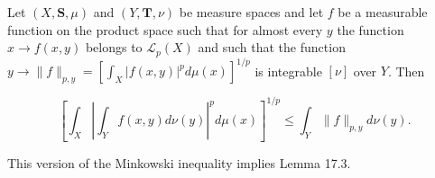Let $(X, \mathbf{S}, \mu)$ and $(Y, \mathbf{T}, \nu)$ be measure spaces and let $f$ be a measurable function on the product space such that for almost every $y$ the function $x \to f(x, y)$ belongs to $\mathcal{L}_p(X)$ and such that the function $y \to \|f\|_{p, y} = [\int_X |f(x, y)|^p d\mu(x)]^{1/p}$ is integrable $[\nu]$ over $Y$. Then

$$\left[ \int_X \left| \int_Y f(x, y) d\nu(y) \right|^p d\mu(x) \right]^{1/p} \leq \int_Y \| f \|_{p, y} d\nu(y).$$

This version of the Minkowski inequality implies Lemma 17.3.
